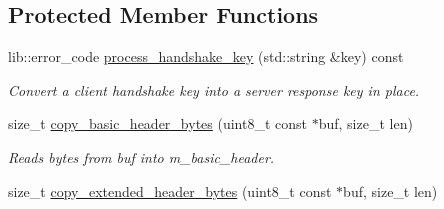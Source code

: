\subsection*{Protected Member Functions}
\begin{DoxyCompactItemize}
\item 
lib\+::error\+\_\+code \hyperlink{classwebsocketpp_1_1processor_1_1hybi13_afe3d2731a39faebab5f927a13e26fb8c}{process\+\_\+handshake\+\_\+key} (std\+::string \&key) const\hypertarget{classwebsocketpp_1_1processor_1_1hybi13_afe3d2731a39faebab5f927a13e26fb8c}{}\label{classwebsocketpp_1_1processor_1_1hybi13_afe3d2731a39faebab5f927a13e26fb8c}

\begin{DoxyCompactList}\small\item\em Convert a client handshake key into a server response key in place. \end{DoxyCompactList}\item 
size\+\_\+t \hyperlink{classwebsocketpp_1_1processor_1_1hybi13_a737c86ee2ec91709052e69f22083afb9}{copy\+\_\+basic\+\_\+header\+\_\+bytes} (uint8\+\_\+t const $\ast$buf, size\+\_\+t len)\hypertarget{classwebsocketpp_1_1processor_1_1hybi13_a737c86ee2ec91709052e69f22083afb9}{}\label{classwebsocketpp_1_1processor_1_1hybi13_a737c86ee2ec91709052e69f22083afb9}

\begin{DoxyCompactList}\small\item\em Reads bytes from buf into m\+\_\+basic\+\_\+header. \end{DoxyCompactList}\item 
size\+\_\+t \hyperlink{classwebsocketpp_1_1processor_1_1hybi13_a79fbd0b0670ab1c345ddbb4db76f6a0b}{copy\+\_\+extended\+\_\+header\+\_\+bytes} (uint8\+\_\+t const $\ast$buf, size\+\_\+t len)\hypertarget{classwebsocketpp_1_1processor_1_1hybi13_a79fbd0b0670ab1c345ddbb4db76f6a0b}{}\label{classwebsocketpp_1_1processor_1_1hybi13_a79fbd0b0670ab1c345ddbb4db76f6a0b}


\end{DoxyCompactItemize}
